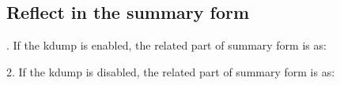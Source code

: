 \documentclass{article}
\begin{document}
\subsection{Reflect in the summary form}
. If the kdump is enabled, the related part of summary form is as:
\begin{figure}[H]        
\end{figure}
2. If the kdump is disabled, the related part of summary form is as:
\begin{figure}[H]        
\end{figure}
\end{document}
